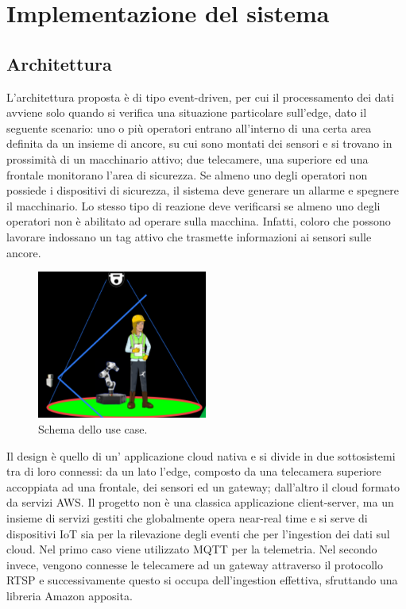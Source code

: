 \chapter{Implementazione del sistema}

\section{Architettura}
L’architettura proposta è di tipo event-driven, per cui il processamento dei dati avviene solo quando si verifica una situazione particolare sull’edge, dato il seguente scenario: uno o più operatori entrano all’interno di una certa area definita da un insieme di ancore, su cui sono montati dei sensori e si trovano in prossimità di un macchinario attivo; due telecamere, una superiore ed una frontale monitorano l’area di sicurezza. Se almeno uno degli operatori non possiede i dispositivi di sicurezza, il sistema deve generare un allarme e spegnere il macchinario. Lo stesso tipo di reazione deve verificarsi se almeno uno degli operatori non è abilitato ad operare sulla macchina. Infatti, coloro che possono lavorare indossano un tag attivo che trasmette informazioni ai sensori sulle ancore.

\begin{figure}[htbp]
    \centering
    \includegraphics[width=0.5\textwidth]{figures/use-case.png}
    \caption{Schema dello use case.} 
    \label{use-case}
\end{figure}


 Il design è quello di un’ applicazione cloud nativa e si divide in due sottosistemi tra di loro connessi: da un lato l'edge, composto da una telecamera superiore accoppiata ad una frontale, dei sensori ed un gateway; dall'altro il cloud formato da servizi AWS. Il progetto non è una classica applicazione client-server, ma un insieme di servizi gestiti che globalmente opera near-real time e si serve di dispositivi IoT sia per la rilevazione degli eventi che per l’ingestion dei dati sul cloud. Nel primo caso viene utilizzato MQTT per la telemetria. Nel secondo invece, vengono connesse le telecamere ad un gateway attraverso il protocollo RTSP e successivamente questo si occupa dell'ingestion effettiva, sfruttando una libreria Amazon apposita. 

